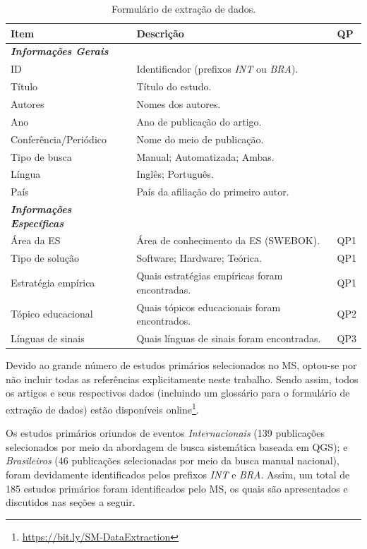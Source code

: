 \begin{table}[htbp]
\centering
\caption{Formulário de extração de dados.}
\label{method:table:data-extraction}
\begin{tabular}{lll}
\hline
\textbf{Item} & \textbf{Descrição} & \textbf{QP} \\ \hline
\textit{\textbf{Informações Gerais}} & & \\ \hline
ID & Identificador (prefixos \textit{INT} ou \textit{BRA}). & \\
Título & Título do estudo. & \\
Autores & Nomes dos autores. & \\
Ano & Ano de publicação do artigo. & \\
Conferência/Periódico & Nome do meio de publicação. & \\
Tipo de busca & Manual; Automatizada; Ambas. & \\
Língua & Inglês; Português. & \\
País & País da afiliação do primeiro autor. & \\ \hline
\textit{\textbf{Informações Específicas}} & & \\ \hline
Área da ES & Área de conhecimento da ES (SWEBOK). & QP1 \\
Tipo de solução & Software; Hardware; Teórica. & QP1 \\
Estratégia empírica & Quais estratégias empíricas foram encontradas. & QP1 \\
Tópico educacional & Quais tópicos educacionais foram encontrados. & QP2 \\
Línguas de sinais & Quais línguas de sinais foram encontradas. & QP3 \\ \hline
\end{tabular}
\fautor
\end{table}

Devido ao grande número de estudos primários selecionados no MS, optou-se por não incluir todas as referências explicitamente neste trabalho. Sendo assim, todos os artigos e seus respectivos dados (incluindo um glossário para o formulário de extração de dados) estão disponíveis online\footnote{\url{https://bit.ly/SM-DataExtraction}}.

Os estudos primários oriundos de eventos \textit{Internacionais} (139 publicações selecionados por meio da abordagem de busca sistemática baseada em QGS); e \textit{Brasileiros} (46 publicações selecionadas por meio da busca manual nacional), foram devidamente identificados pelos prefixos \textit{INT} e \textit{BRA}. Assim, um total de 185 estudos primários foram identificados pelo MS, os quais são apresentados e discutidos nas seções a seguir.

